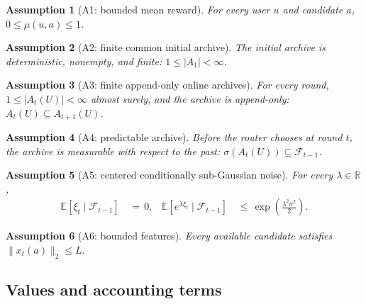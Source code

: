 \documentclass{article} %
\newtheorem{assumption}{Assumption}
\begin{document}
\begin{assumption}[A1: bounded mean reward]
\label{ass:app-bounded}
For every user \(u\) and candidate \(a\),
\(0\leq\mu(u,a)\leq 1\).
\end{assumption}

\begin{assumption}[A2: finite common initial archive]
\label{ass:app-finite-initial}
The initial archive is deterministic, nonempty, and finite:
\(1\leq |A_1|<\infty\).
\end{assumption}

\begin{assumption}[A3: finite append-only online archives]
\label{ass:app-append-only}
For every round, \(1\leq |A_t(U)|<\infty\) almost surely, and the archive is
append-only: \(A_t(U)\subseteq A_{t+1}(U)\).
\end{assumption}

\begin{assumption}[A4: predictable archive]
\label{ass:app-predictable}
Before the router chooses at round \(t\), the archive is measurable with
respect to the past: \(\sigma(A_t(U))\subseteq\mathcal F_{t-1}\).
\end{assumption}

\begin{assumption}[A5: centered conditionally sub-Gaussian noise]
\label{ass:app-noise}
For every \(\lambda\in\mathbb R\),
\begin{equation}
\begin{aligned}
\mathbb E[\xi_t\mid\mathcal F_{t-1}] &\,=\,0, &
\mathbb E\!\left[e^{\lambda\xi_t}\mid\mathcal F_{t-1}\right]
&\,\leq\,\exp\!\left(\frac{\lambda^2\sigma^2}{2}\right).
\end{aligned}
\end{equation}
\end{assumption}

\begin{assumption}[A6: bounded features]
\label{ass:app-features}
Every available candidate satisfies \(\|x_t(a)\|_2\leq L\).
\end{assumption}

\subsection{Values and accounting terms}
\end{document}
